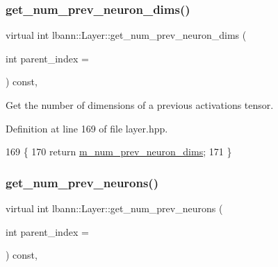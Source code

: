 \mbox{\label{classlbann_1_1Layer_ace32c7df942a8d97d7a25cb8ff8ce71d}} 
\subsubsection{\texorpdfstring{get\+\_\+num\+\_\+prev\+\_\+neuron\+\_\+dims()}{get\_num\_prev\_neuron\_dims()}}
{\footnotesize\ttfamily virtual int lbann\+::\+Layer\+::get\+\_\+num\+\_\+prev\+\_\+neuron\+\_\+dims (\begin{DoxyParamCaption}\item[{int}]{parent\+\_\+index = {} }\end{DoxyParamCaption}) const\hspace{0.3cm}{\ttfamily [inline]}, {\ttfamily [virtual]}}

Get the number of dimensions of a previous activations tensor. 

Definition at line 169 of file layer.\+hpp.


\begin{DoxyCode}
169                                                                    \{
170     \textcolor{keywordflow}{return} \hyperlink{classlbann_1_1Layer_adc052afb38f170e839db00d3c8151d1e}{m\_num\_prev\_neuron\_dims};
171   \}
\end{DoxyCode}
\mbox{\label{classlbann_1_1Layer_a27112eb70bbfbd7f3c3e749960400dec}} 
\subsubsection{\texorpdfstring{get\+\_\+num\+\_\+prev\+\_\+neurons()}{get\_num\_prev\_neurons()}}
{\footnotesize\ttfamily virtual int lbann\+::\+Layer\+::get\+\_\+num\+\_\+prev\+\_\+neurons (\begin{DoxyParamCaption}\item[{int}]{parent\+\_\+index = {} }\end{DoxyParamCaption}) const\hspace{0.3cm}{\ttfamily [inline]}, {\ttfamily [virtual]}}

